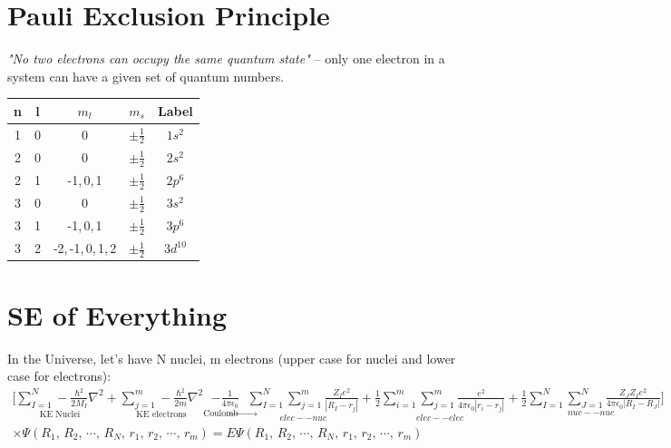 \documentclass[a4paper, 11pt, normalem]{report}
\begin{document}
\section{Pauli Exclusion Principle}
\emph{"No two electrons can occupy the same quantum state"} -- only one electron in a system can have a given set of quantum numbers.
\begin{table}[H]
    \centering
    \begin{tabular}{|c|ccc|c|}
        \hline
        \rowcolor{lightgray} n & l & $m_{l}$ & $m_{s}$ & Label \\
        \hline
        1 & 0 & 0 & $\pm \frac{1}{2}$ & $1s^{2}$ \\
        2 & 0 & 0 & $\pm \frac{1}{2}$ & $2s^{2}$ \\
        2 & 1 & -1,\,0,\,1 & $\pm \frac{1}{2}$ & $2p^{6}$ \\
        3 & 0 & 0 & $\pm \frac{1}{2}$ & $3s^{2}$ \\
        3 & 1 & -1,\,0,\,1 & $\pm \frac{1}{2}$ & $3p^{6}$ \\
        3 & 2 & -2,\,-1,\,0,\,1,\,2 & $\pm \frac{1}{2}$ & $3d^{10}$\\
        \hline
    \end{tabular}
\end{table}

\section{SE of Everything}
In the Universe, let's have N nuclei, m electrons (upper case for nuclei and lower case for electrons):
\begin{multline*}
    \Bigg[\underset{\text{KE Nuclei}}{\sum_{I = 1}^{N}-\frac{\hbar^{2}}{2M_{I}}\nabla^{2}} + \underset{\text{KE electrons}}{\sum_{j = 1}^{m}-\frac{\hbar^{2}}{2m} \nabla^{2}} \underset{\text{Coulomb} \rightarrow}{- \frac{1}{4\pi\epsilon_{0}}} \underset{elec--nuc}{\sum_{I = 1}^{N}\sum_{j = 1}^{m}\frac{Z_{I}e^{2}}{|R_{I} - r_{j}|}} + \underset{elec--elec}{\frac{1}{2}\sum_{i = 1}^{m}\sum_{j = 1}^{m}\frac{e^{2}}{4\pi\epsilon_{0}|r_{i} - r_{j}|}} + \underset{nuc--nuc}{\frac{1}{2}\sum_{I = 1}^{N}\sum_{J = 1}^{N}\frac{Z_{J}Z_{I}e^{2}}{4\pi\epsilon_{0}|R_{I} - R_{J}|}}\Bigg] \\
    \times \Psi(R_{1},\,R_{2},\, \cdots ,\,R_{N},\,r_{1},\,r_{2},\, \cdots ,\,r_{m}) = E\Psi(R_{1},\,R_{2},\, \cdots ,\,R_{N},\,r_{1},\,r_{2},\, \cdots ,\,r_{m})
\end{multline*}

\end{document}
